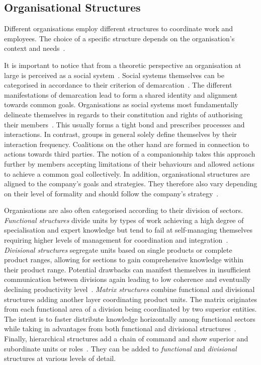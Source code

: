 \subsection{Organisational Structures}

Different organisations employ different structures to coordinate work and employees. The choice of a specific structure depends on the organisation's context and needs~\citep{baligh2010orgs}.

It is important to notice that from a theoretic perspective an organisation at large is perceived as a social system~\citep{takahara2003org}. Social systems themselves can be categorised in accordance to their criterion of demarcation~\citep{takahara2003org}. The different manifestations of demarcation lead to form a shared identity and alignment towards common goals. Organisations as social systems most fundamentally delineate themselves in regards to their constitution and rights of authorising their members~\citep{baligh2010orgs}. This usually forms a tight bond and prescribes processes and interactions. In contrast, groups in general solely define themselves by their interaction frequency. Coalitions on the other hand are formed in connection to actions towards third parties. The notion of a companionship takes this approach further by members accepting limitations of their behaviours and allowed actions to achieve a common goal collectively. In addition, organisational structures are aligned to the company's goals and strategies. They therefore also vary depending on their level of formality and should follow the company's strategy~\citep{chandler1962strategystructure}. 

Organisations are also often categorised according to their division of sectors. \emph{Functional structures} divide units by types of work achieving a high degree of specialisation and expert knowledge but tend to fail at self-managing themselves requiring higher levels of management for coordination and integration~\citep{price2007hrm}. \emph{Divisional structures}
segregate units based on single products or complete product ranges, allowing for sections to gain comprehensive knowledge within their product range. Potential drawbacks can manifest themselves in insufficient communication between divisions again leading to low coherence and eventually declining productivity level~\citep{price2007hrm}. \emph{Matrix structures}
combine functional and divisional structures adding another layer coordinating product units. The matrix originates from each functional area of a division being coordinated by two superior entities. The intent is to faster distribute knowledge horizontally among functional sectors while taking in advantages from both functional and divisional structures~\citep{galbraith2008matrix}. Finally, {hierarchical structures} add a chain of command and show superior and subordinate units or roles~\citep{healeyprojectmanagement}. They can be added to \emph{functional} and \emph{divisional} structures at various levels of detail.
